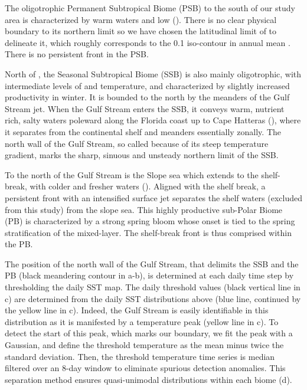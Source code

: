 The oligotrophic Permanent Subtropical Biome (PSB)  to the south of our study area is characterized by warm waters and low  ().
There is no clear physical boundary to its northern limit so we have chosen the latitudinal limit of  to delineate it, which roughly corresponds to the \qty{0.1}{\mgm}  iso-contour in annual mean .
There is no persistent front in the PSB\@.

North of , the Seasonal Subtropical Biome (SSB)  is also mainly oligotrophic, with intermediate levels of  and temperature, and characterized by slightly increased productivity in winter.
It is bounded to the north by the meanders of the Gulf Stream jet.
When the Gulf Stream enters the SSB, it conveys warm, nutrient rich, salty waters poleward along the Florida coast up to Cape Hatteras (), where it separates from the continental shelf and meanders essentially zonally.
The north wall of the Gulf Stream, so called because of its steep temperature gradient, marks the sharp, sinuous and unsteady northern limit of the SSB\@.

To the north of the Gulf Stream is the Slope sea which extends to the shelf-break, with colder and fresher waters (\cite{linder_1998}).
Aligned with the shelf break, a persistent front with an intensified surface jet separates the shelf waters (excluded from this study) from the slope sea.
This highly productive sub-Polar Biome (PB)  is characterized by a strong spring bloom whose onset is tied to the spring stratification of the mixed-layer.
The shelf-break front is thus comprised within the PB\@.

The position of the north wall of the Gulf Stream, that delimits the SSB and the PB (black meandering contour in a-b), is determined at each daily time step by thresholding the daily SST map.
The daily threshold values (black vertical line in c) are determined from the daily SST distributions above  (blue line, continued by the yellow line in c).
Indeed, the Gulf Stream is easily identifiable in this distribution as it is manifested by a temperature peak (yellow line in c).
To detect the start of this peak, which marks our boundary, we fit the peak with a Gaussian, and define the threshold temperature as the mean minus twice the standard deviation.
Then, the threshold temperature time series is median filtered over an 8-day window to eliminate spurious detection anomalies.
This separation method ensures quasi-unimodal  distributions within each biome (d).

